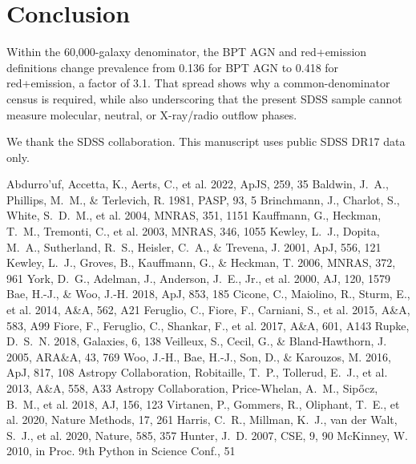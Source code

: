 \documentclass[twocolumn]{aastex631}
\begin{document}
\section{Conclusion}\label{sec:conclusion}
Within the 60,000-galaxy denominator, the BPT AGN and red+emission definitions change prevalence from 0.136 for BPT AGN to 0.418 for red+emission, a factor of 3.1. That spread shows why a common-denominator census is required, while also underscoring that the present SDSS sample cannot measure molecular, neutral, or X-ray/radio outflow phases.

\acknowledgments
We thank the SDSS collaboration. This manuscript uses public SDSS DR17 data only.


\begin{thebibliography}{}
 Abdurro'uf, Accetta, K., Aerts, C., et al. 2022, ApJS, 259, 35
 Baldwin, J.~A., Phillips, M.~M., \& Terlevich, R. 1981, PASP, 93, 5
 Brinchmann, J., Charlot, S., White, S.~D.~M., et al. 2004, MNRAS, 351, 1151
 Kauffmann, G., Heckman, T.~M., Tremonti, C., et al. 2003, MNRAS, 346, 1055
 Kewley, L.~J., Dopita, M.~A., Sutherland, R.~S., Heisler, C.~A., \& Trevena, J. 2001, ApJ, 556, 121
 Kewley, L.~J., Groves, B., Kauffmann, G., \& Heckman, T. 2006, MNRAS, 372, 961
 York, D.~G., Adelman, J., Anderson, J.~E., Jr., et al. 2000, AJ, 120, 1579
 Bae, H.-J., \& Woo, J.-H. 2018, ApJ, 853, 185
 Cicone, C., Maiolino, R., Sturm, E., et al. 2014, A\&A, 562, A21
 Feruglio, C., Fiore, F., Carniani, S., et al. 2015, A\&A, 583, A99
 Fiore, F., Feruglio, C., Shankar, F., et al. 2017, A\&A, 601, A143
 Rupke, D.~S.~N. 2018, Galaxies, 6, 138
 Veilleux, S., Cecil, G., \& Bland-Hawthorn, J. 2005, ARA\&A, 43, 769
 Woo, J.-H., Bae, H.-J., Son, D., \& Karouzos, M. 2016, ApJ, 817, 108
 Astropy Collaboration, Robitaille, T.~P., Tollerud, E.~J., et al. 2013, A\&A, 558, A33
 Astropy Collaboration, Price-Whelan, A.~M., Sip{\H{o}}cz, B.~M., et al. 2018, AJ, 156, 123
 Virtanen, P., Gommers, R., Oliphant, T.~E., et al. 2020, Nature Methods, 17, 261
 Harris, C.~R., Millman, K.~J., van der Walt, S.~J., et al. 2020, Nature, 585, 357
 Hunter, J.~D. 2007, CSE, 9, 90
 McKinney, W. 2010, in Proc. 9th Python in Science Conf., 51
\end{thebibliography}
\end{document}
